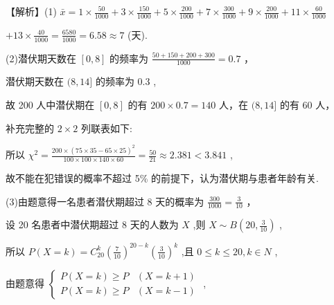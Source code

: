 \documentclass[10pt]{article}
\begin{document}
【解析】(1) \(\bar{x} = 1 \times  \frac{50}{1000} + 3 \times  \frac{150}{1000} + 5 \times  \frac{200}{1000} + 7 \times  \frac{300}{1000} + 9 \times  \frac{200}{1000} + {11} \times  \frac{60}{1000}\)

\(+ {13} \times  \frac{40}{1000} = \frac{6580}{1000} = {6.58} \approx  7\) (天).

(2)潜伏期天数在 \(\left\lbrack  {0,8}\right\rbrack\) 的频率为 \(\frac{{50} + {150} + {200} + {300}}{1000} = {0.7}\) ，

潜伏期天数在 \((8,{14}\rbrack\) 的频率为 0.3 ,

故 200 人中潜伏期在 \(\left\lbrack  {0,8}\right\rbrack\) 的有 \({200} \times  {0.7} = {140}\) 人，在 \((8,{14}\rbrack\) 的有 60 人，

补充完整的 \(2 \times  2\) 列联表如下:

\begin{center}
\end{center}

所以 \({\chi }^{2} = \frac{{200} \times  {\left( {75} \times  {35} - {65} \times  {25}\right) }^{2}}{{100} \times  {100} \times  {140} \times  {60}} = \frac{50}{21} \approx  {2.381} < {3.841}\) ,

故不能在犯错误的概率不超过 5\% 的前提下，认为潜伏期与患者年龄有关.

(3)由题意得一名患者潜伏期超过 8 天的概率为 \(\frac{300}{1000} = \frac{3}{10}\) ，

设 20 名患者中潜伏期超过 8 天的人数为 \(X\) ,则 \(X \sim  B\left( {{20},\frac{3}{10}}\right)\) ,

所以 \(P\left( {X = k}\right)  = {C}_{20}^{k}{\left( \frac{7}{10}\right) }^{{20} - k}{\left( \frac{3}{10}\right) }^{k}\) ,且 \(0 \leq  k \leq  {20},k \in  N\) ,

由题意得 \(\left\{  \begin{array}{ll} P\left( {X = k}\right)  \geq  P & \left( {X = k + 1}\right) \\  P\left( {X = k}\right)  \geq  P & \left( {X = k - 1}\right)  \end{array}\right.\) ,
\end{document}
